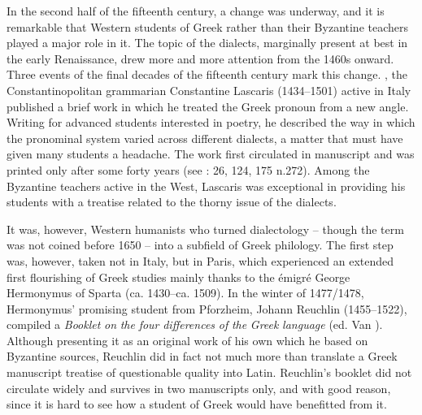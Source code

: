In the second half of the fifteenth century, a change was underway, and it is remarkable that Western students of Greek rather than their Byzantine teachers played a major role in it. The topic of the dialects, marginally present at best in the early Renaissance, drew more and more attention from the 1460s onward. Three events of the final decades of the fifteenth century mark this change. \citealt{In1460}, the Constantinopolitan grammarian Constantine Lascaris (1434–1501) active in Italy published a brief work in which he treated the Greek pronoun from a new angle. Writing for advanced students interested in poetry, he described the way in which the pronominal system varied across different dialects, a matter that must have given many students a headache. The work first circulated in manuscript and was printed only after some forty years (see \citealt{Botley2010}: 26, 124, 175 n.272). Among the Byzantine teachers active in the West, Lascaris was exceptional in providing his students with a treatise related to the thorny issue of the dialects.

It was, however, Western humanists who turned dialectology – though the term was not coined before 1650 – into a subfield of Greek philology. The first step was, however, taken not in Italy, but in Paris, which experienced an extended first flourishing of Greek studies mainly thanks to the émigré George Hermonymus of Sparta (ca. 1430–ca. 1509). In the winter of 1477/1478, Hermonymus’ promising student from Pforzheim, Johann Reuchlin (1455–1522), compiled a \textit{Booklet} \textit{on} \textit{the} \textit{four} \textit{differences} \textit{of} \textit{the} \textit{Greek} \textit{language} (ed. Van \citealt{Rooy2014}). Although presenting it as an original work of his own which he based on Byzantine sources, Reuchlin did in fact not much more than translate a Greek manuscript treatise of questionable quality into Latin. Reuchlin’s booklet did not circulate widely and survives in two manuscripts only, and with good reason, since it is hard to see how a student of Greek would have benefitted from it.

